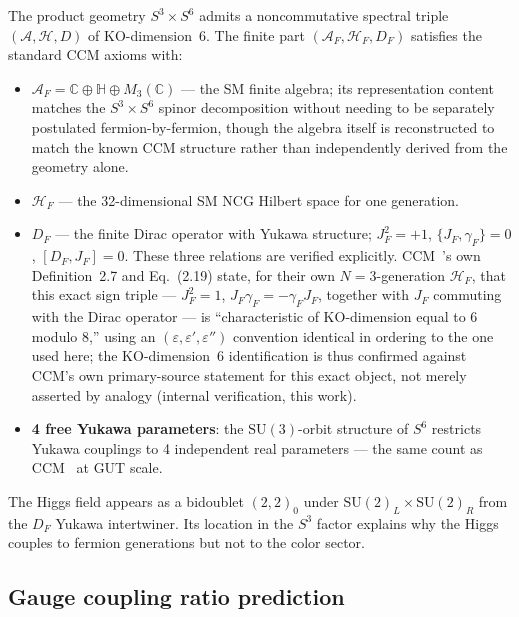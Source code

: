 \documentclass[12pt,a4paper]{article}
\newcommand{\CC}{\mathbb{C}}
\newcommand{\HH}{\mathbb{H}}
\begin{document}
The product geometry $S^3\times S^6$ admits a noncommutative spectral triple $(\mathcal{A},\mathcal{H},D)$
of KO-dimension~6. The finite part $(\mathcal{A}_F, \mathcal{H}_F, D_F)$ satisfies the
standard CCM axioms with:
\begin{itemize}
  \item $\mathcal{A}_F = \CC\oplus\HH\oplus M_3(\CC)$ --- the SM finite algebra; its
        representation content matches the $S^3\times S^6$ spinor decomposition without
        needing to be separately postulated fermion-by-fermion, though the algebra
        itself is reconstructed to match the known CCM structure rather than
        independently derived from the geometry alone.
  \item $\mathcal{H}_F$ --- the 32-dimensional SM NCG Hilbert space for one generation.
  \item $D_F$ --- the finite Dirac operator with Yukawa structure; $J_F^2=+1$,
        $\{J_F,\gamma_F\}=0$, $[D_F,J_F]=0$. These three relations are verified
        explicitly. CCM~\cite{CCM2006}'s own Definition~2.7 and Eq.~(2.19) state,
        for their own $N=3$-generation $\mathcal{H}_F$, that this exact sign triple
        --- $J_F^2=1$, $J_F\gamma_F=-\gamma_F J_F$, together with $J_F$ commuting with
        the Dirac operator --- is ``characteristic of KO-dimension equal to 6 modulo
        8,'' using an $(\varepsilon,\varepsilon',\varepsilon'')$ convention identical
        in ordering to the one used here; the KO-dimension~6 identification is thus
        confirmed against CCM's own primary-source statement for this exact object,
        not merely asserted by analogy (internal verification, this work).
  \item \textbf{4 free Yukawa parameters}: the $\mathrm{SU}(3)$-orbit structure of $S^6$
        restricts Yukawa couplings to 4 independent real parameters --- the same count as
        CCM~\cite{CCM2006} at GUT scale.
\end{itemize}
The Higgs field appears as a bidoublet $(2,2)_0$ under $\mathrm{SU}(2)_L\times\mathrm{SU}(2)_R$
from the $D_F$ Yukawa intertwiner. Its location in the $S^3$ factor explains why the Higgs
couples to fermion generations but not to the color sector.

\subsection{Gauge coupling ratio prediction}
\label{sec:coupling}
\end{document}
